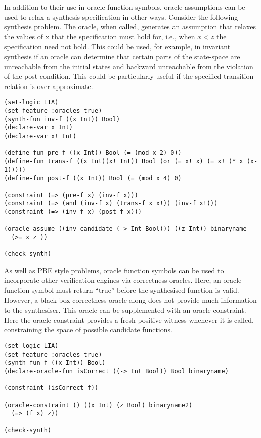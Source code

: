 \documentclass[english,a4paper,10pt]{article}
\begin{document}
\begin{example}
In addition to their use in oracle function symbols, oracle assumptions can be used to relax a synthesis specification in other ways. Consider the following synthesis problem. The oracle, when called, generates an assumption that relaxes the values of x that the specification must hold for, i.e., when $x < z$ the specification need not hold. This could be used, for example, in invariant synthesis if an oracle can determine that certain parts of the state-space are unreachable from the initial states and backward unreachable from the violation of the post-condition. This could be particularly useful if the specified transition relation is over-approximate.

\begin{lstlisting}[language=SyGuS]
(set-logic LIA)
(set-feature :oracles true) 
(synth-fun inv-f ((x Int)) Bool)
(declare-var x Int)
(declare-var x! Int)

(define-fun pre-f ((x Int)) Bool (= (mod x 2) 0))
(define-fun trans-f ((x Int)(x! Int)) Bool (or (= x! x) (= x! (* x (x-1)))))
(define-fun post-f ((x Int)) Bool (= (mod x 4) 0)

(constraint (=> (pre-f x) (inv-f x)))
(constraint (=> (and (inv-f x) (trans-f x x!)) (inv-f x!)))
(constraint (=> (inv-f x) (post-f x)))

(oracle-assume ((inv-candidate (-> Int Bool))) ((z Int)) binaryname
  (>= x z ))

(check-synth)
\end{lstlisting}
\end{example}


\begin{example}

As well as PBE style problems, oracle function symbols can be used to incorporate other verification engines via correctness oracles. Here, an oracle function symbol must return ``true'' before the synthesised function is valid. However, a black-box correctness oracle along does not provide much information to the synthesiser. This oracle can be supplemented with an oracle constraint. Here the oracle constraint provides a fresh positive witness whenever it is called, constraining the space of possible candidate functions. 

\begin{lstlisting}[language=SyGuS]
(set-logic LIA)
(set-feature :oracles true) 
(synth-fun f ((x Int)) Bool)
(declare-oracle-fun isCorrect ((-> Int Bool)) Bool binaryname)

(constraint (isCorrect f))

(oracle-constraint () ((x Int) (z Bool) binaryname2)
  (=> (f x) z))

(check-synth)
\end{lstlisting}
\end{example}
\end{document}
